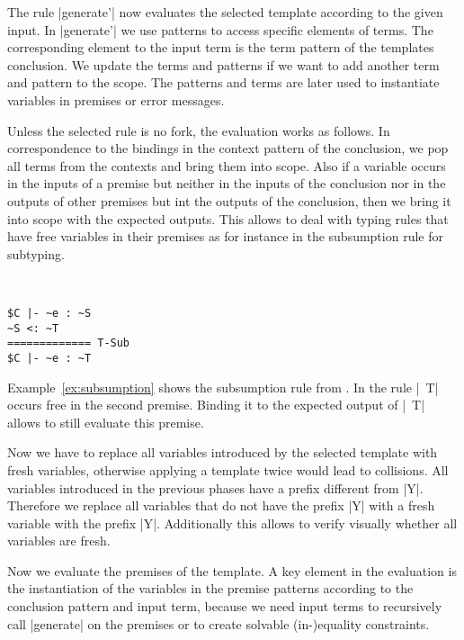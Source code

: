 The rule \code|generate'| now evaluates the selected template
according to the given input. In \code|generate'| we use patterns to
access specific elements of terms. The corresponding element to the
input term is the term pattern of the templates conclusion. We update
the terms and patterns if we want to add another term and pattern to
the scope. The patterns and terms are later used to instantiate
variables in premises or error messages.

Unless the selected rule is no fork, the evaluation works as
follows. In correspondence to the bindings in the context pattern of
the conclusion, we pop all terms from the contexts and bring them into
scope. Also if a variable occurs in the inputs of a premise but
neither in the inputs of the conclusion nor in the outputs of other
premises but int the outputs of the conclusion, then we bring it into
scope with the expected outputs.  This
allows to deal with typing rules that have free variables in their
premises as for instance in the subsumption rule for subtyping.

\begin{example}{~}
\begin{lstlisting}[language=sltc]
$C |- ~e : ~S
~S <: ~T
============= T-Sub
$C |- ~e : ~T
\end{lstlisting}
\label{ex:subsumption}
\end{example}

Example~\ref{ex:subsumption} shows the subsumption rule from
. In the rule \code|~T| occurs free in the second
premise. Binding it to the expected output of \code|~T| allows to
still evaluate this premise.

Now we have to replace all variables introduced by the selected
template with fresh variables, otherwise applying a template twice
would lead to collisions. All variables introduced in the previous
phases have a prefix different from \code|Y|. Therefore we replace all
variables that do not have the prefix \code|Y| with a fresh variable
with the prefix \code|Y|. Additionally this allows to verify visually
whether all variables are fresh.

Now we evaluate the premises of the template. A key element in the
evaluation is the instantiation of the variables in the premise
patterns according to the conclusion pattern and input term, because
we need input terms to recursively call \code|generate| on the
premises or to create solvable (in-)equality
constraints. 

